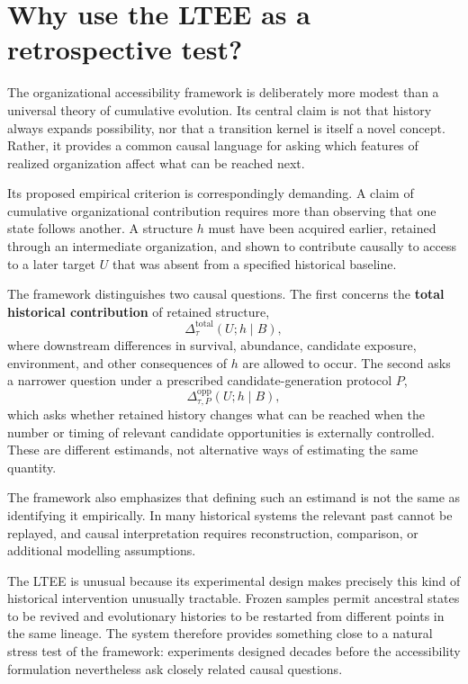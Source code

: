 \documentclass[11pt]{article}
\begin{document}
\section{Why use the LTEE as a retrospective test?}

The organizational accessibility framework is deliberately more modest than a universal theory of cumulative evolution. Its central claim is not that history always expands possibility, nor that a transition kernel is itself a novel concept. Rather, it provides a common causal language for asking which features of realized organization affect what can be reached next.

Its proposed empirical criterion is correspondingly demanding. A claim of cumulative organizational contribution requires more than observing that one state follows another. A structure $h$ must have been acquired earlier, retained through an intermediate organization, and shown to contribute causally to access to a later target $U$ that was absent from a specified historical baseline.

The framework distinguishes two causal questions. The first concerns the \textbf{total historical contribution} of retained structure,
\[
\Delta_{\tau}^{\mathrm{total}}(U;h\mid B),
\]
where downstream differences in survival, abundance, candidate exposure, environment, and other consequences of $h$ are allowed to occur. The second asks a narrower question under a prescribed candidate-generation protocol $P$,
\[
\Delta_{\tau,P}^{\mathrm{opp}}(U;h\mid B),
\]
which asks whether retained history changes what can be reached when the number or timing of relevant candidate opportunities is externally controlled. These are different estimands, not alternative ways of estimating the same quantity.

The framework also emphasizes that defining such an estimand is not the same as identifying it empirically. In many historical systems the relevant past cannot be replayed, and causal interpretation requires reconstruction, comparison, or additional modelling assumptions.

The LTEE is unusual because its experimental design makes precisely this kind of historical intervention unusually tractable. Frozen samples permit ancestral states to be revived and evolutionary histories to be restarted from different points in the same lineage. The system therefore provides something close to a natural stress test of the framework: experiments designed decades before the accessibility formulation nevertheless ask closely related causal questions.
\end{document}
